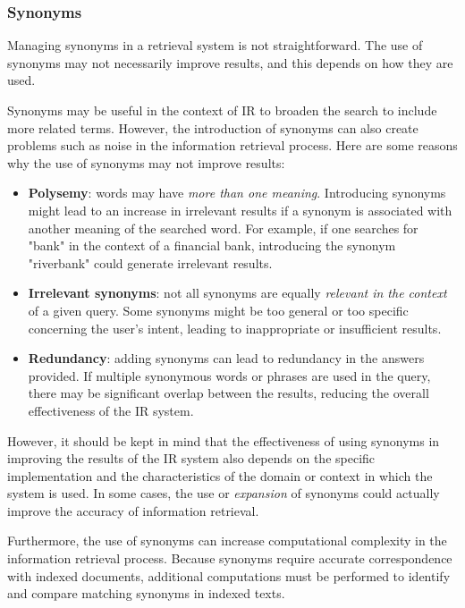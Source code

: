 \subsubsection{Synonyms}
\label{subsubsec:synonyms}

Managing synonyms in a retrieval system is not straightforward. The use of synonyms may not necessarily improve results, and this depends on how they are used.

Synonyms may be useful in the context of \ac{IR} to broaden the search to include more related terms. However, the introduction of synonyms can also create problems such as noise in the information retrieval process. Here are some reasons why the use of synonyms may not improve results:
\begin{itemize}
	\item \textbf{Polysemy}: words may have \emph{more than one meaning}. Introducing synonyms might lead to an increase in irrelevant results if a synonym is associated with another meaning of the searched word. For example, if one searches for "bank" in the context of a financial bank, introducing the synonym "riverbank" could generate irrelevant results.
	\item \textbf{Irrelevant synonyms}: not all synonyms are equally \emph{relevant in the context} of a given query. Some synonyms might be too general or too specific concerning the user's intent, leading to inappropriate or insufficient results.
	\item \textbf{Redundancy}: adding synonyms can lead to redundancy in the answers provided. If multiple synonymous words or phrases are used in the query, there may be significant overlap between the results, reducing the overall effectiveness of the IR system.
\end{itemize}

However, it should be kept in mind that the effectiveness of using synonyms in improving the results of the IR system also depends on the specific implementation and the characteristics of the domain or context in which the system is used. In some cases, the use or \emph{expansion} of synonyms could actually improve the accuracy of information retrieval. 

Furthermore, the use of synonyms can increase computational complexity in the information retrieval process. Because synonyms require accurate correspondence with indexed documents, additional computations must be performed to identify and compare matching synonyms in indexed texts. \\

